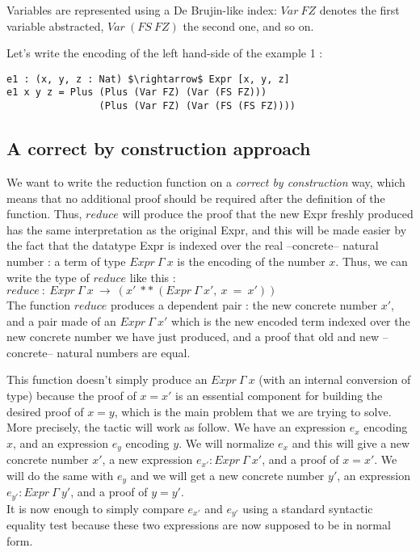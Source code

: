 Variables are represented using a De Brujin-like index: $Var\:FZ$ denotes the first variable abstracted, $Var\:(FS\:FZ)$ the second one, and so on.

Let's write the encoding of the left hand-side of the example 1 :
\begin{lstlisting}
e1 : (x, y, z : Nat) $\rightarrow$ Expr [x, y, z]
e1 x y z = Plus (Plus (Var FZ) (Var (FS FZ))) 
                (Plus (Var FZ) (Var (FS (FS FZ))))
\end{lstlisting}



	\subsection{A correct by construction approach}
\label{sect:aCorrectByConstructionApproach}

We want to write the reduction function on a \emph{correct by construction} way, which means that no additional proof should be required after the definition of the function. Thus, $reduce$ will produce the proof that the new Expr freshly produced has the same interpretation as the original Expr, and this will be made easier by the fact that the datatype Expr is indexed over the real --concrete-- natural number : a term of type $Expr\ \Gamma\ x$ is the encoding of the number $x$.
Thus, we can write the type of $reduce$ like this : \\
$reduce\ :\ Expr\ \Gamma\ x\ \rightarrow\ (x'\ **\ (Expr\ \Gamma\ x',\ x\ =\ x'))$ \\
The function $reduce$ produces a dependent pair : the new concrete number $x'$, and a pair made of an $Expr\ \Gamma\ x'$ which is the new encoded term indexed over the new concrete number we have just produced, and a proof that old and new --concrete-- natural numbers are equal.

This function doesn't simply produce an $Expr\ \Gamma\ x$ (with an internal conversion of type) because the proof of $x=x'$ is an essential component for building the desired proof of $x=y$, which is the main problem that we are trying to solve.
\\
More precisely, the tactic will work as follow.
We have an expression $e_x$ encoding $x$, and an expression $e_y$ encoding $y$. We will normalize $e_x$ and this will give a new concrete number $x'$, a new expression $e_{x'}:Expr\ \Gamma\ x'$, and a proof of $x=x'$. We will do the same with $e_y$ and we will get a new concrete number $y'$, an expression $e_{y'}:Expr\ \Gamma\ y'$, and a proof of $y=y'$. \\
It is now enough to simply compare $e_{x'}$ and $e_{y'}$ using a standard syntactic equality test because these two expressions are now supposed to be in normal form.


